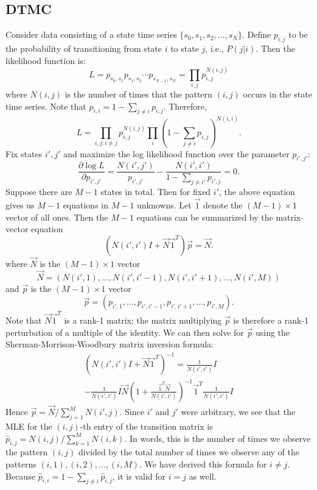 \documentclass[review,letterpaper,11pt]{elsarticle}
\begin{document}
\subsection{DTMC}
\label{sect:dtmcmle}
Consider data consisting of a state time series $\{s_0, s_1, s_2, \ldots, s_N\}$.  Define $p_{i,j}$ to be the probability of transitioning from state $i$ to state $j$, i.e., $P(j | i)$.  Then the likelihood function is:
\begin{equation*}
L = p_{s_0, s_1} p_{s_1, s_2} \cdots p_{s_{N-1}, s_N} = \prod_{i, j} p_{i,j}^{N(i,j)}
\end{equation*}
where $N(i,j)$ is the number of times that the pattern $(i,j)$ occurs in the state time series.  Note that $p_{i,i} = 1 - \sum_{j \neq i} p_{i,j}$.  Therefore,
$$
L = \prod_{i, j : i \neq j} p_{i,j}^{N(i,j)} \prod_{i} \left(1 - \sum_{j \neq i} p_{i,j} \right)^{N(i,i)}.
$$
Fix states $i', j'$ and maximize the log likelihood function over the parameter $p_{i',j'}$:
$$
\frac{\partial \log L}{\partial p_{i',j'}} = \frac{N(i',j')}{p_{i',j'}} - \frac{N(i',i')}{1 - \sum_{j \neq i'} p_{i',j}} = 0.
$$
Suppose there are $M-1$ states in total.  Then for fixed $i'$, the above equation gives us $M-1$ equations in $M-1$ unknowns.  Let $\vec{1}$ denote the $(M-1) \times 1$ vector of all ones.  Then the $M-1$ equations can be summarized by the matrix-vector equation
$$
\left( N(i',i') I  + \vec{N} \vec{1}^T \right) \vec{p} = \vec{N}.
$$
where $\vec{N}$ is the $(M-1) \times 1$ vector
$$
\vec{N} = (N(i',1),\ldots,N(i',i'-1),N(i',i'+1),\ldots,N(i',M))
$$
and $\vec{p}$ is the $(M-1) \times 1$ vector
$$
\vec{p} = (p_{i',1},\ldots,p_{i',i'-1},p_{i',i'+1},\ldots,p_{i',M}).
$$
Note that $\vec{N} \vec{1}^T$ is a rank-1 matrix; the matrix multiplying $\vec{p}$ is therefore a rank-1 perturbation of a multiple of the identity.
We can then solve for $\vec{p}$ using the Sherman-Morrison-Woodbury matrix inversion formula:
\begin{multline*}
\left( N(i',i') I  + \vec{N} \vec{1}^T \right)^{-1} = \frac{1}{N(i',i')} I \\
- \frac{1}{N(i',i')} I \vec{N} \left( 1 + \frac{\vec{1}^T \vec{N}}{N(i',i')} \right)^{-1} \vec{1}^T \frac{1}{N(i',i')} I
\end{multline*}
Hence $\vec{p} = \vec{N} / {\sum_{j=1}^{M} N(i',j)}$.  Since $i'$ and $j'$ were arbitrary, we see that the MLE for the $(i,j)$-th entry of the transition matrix is $\widehat{p}_{i,j} = {N(i,j)}/{\sum_{k=1}^{M} N(i,k)}$.  In words, this is the number of times we observe the pattern $(i,j)$ divided by the total number of times we observe any of the patterns $(i,1), (i,2), \ldots, (i,M)$.  We have derived this formula for $i \neq j$.  Because $\widehat{p}_{i,i} = 1 - \sum_{j \neq i} \widehat{p}_{i,j}$, it is valid for $i=j$ as well.
\end{document}
